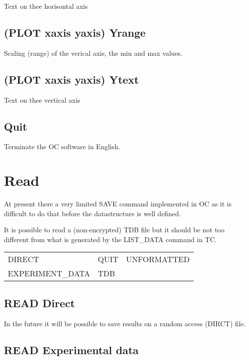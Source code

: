 \documentclass[12pt]{article}
\begin{document}
Text on thee horisontal axis

\subsection{(PLOT xaxis yaxis) Yrange}

Scaling (range) of the verical axis, the min and max values.

\subsection{(PLOT xaxis yaxis) Ytext}

Text on thee vertical axis

\subsection{Quit }

Terminate the OC software in English.

\section{Read }

At present there a very limited SAVE command implemented in OC as it
is difficult to do that before the datastructure is well defined.

It is possible to read a (non-encrypted) TDB file but it should be not
too different from what is generated by the LIST\_DATA command in TC.

\begin{tabular}{lll}
 DIRECT          & QUIT    &         UNFORMATTED\\
 EXPERIMENT\_DATA & TDB\\
\end{tabular}

\subsection{READ Direct}

In the future it will be possible to save results on a random access
(DIRCT) file.

\subsection{READ Experimental data}
\end{document}
